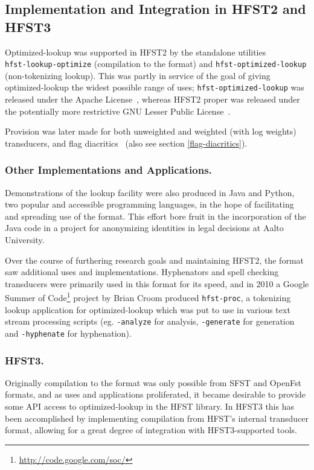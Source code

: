 \documentclass{llncs}
\begin{document}
\subsection{Implementation and Integration in HFST2 and HFST3}
Optimized-lookup was supported in HFST2 by the standalone utilities\\
\verb+hfst-lookup-optimize+ (compilation to the format) and
\verb+hfst-optimized-lookup+ (non-tokenizing lookup). This was partly
in service of the goal of giving optimized-lookup the widest possible range
of uses; \verb+hfst-optimized-lookup+ was released under the
Apache License~\cite{apache-license}, whereas HFST2 proper was released
under the potentially more restrictive GNU Lesser Public
License~\cite{lgpl-license}.

Provision was later made for both unweighted and weighted (with log weights)
transducers, and flag diacritics~\cite{beesley/2003} (also see section
\ref{flag-diacritics}).

\subsubsection{Other Implementations and Applications.}
Demonstrations of the lookup facility were also
produced in Java and Python, two popular and accessible programming languages,
in the hope of facilitating and spreading use of the format. This effort
bore fruit in the incorporation of the Java code in a project for anonymizing
identities in legal decisions at Aalto University.

Over the course of furthering research goals and maintaining HFST2,
the format saw additional uses and implementations. Hyphenators and spell
checking transducers were primarily used in this format for its speed, and
in 2010 a Google Summer of Code\footnote{\url{http://code.google.com/soc/}} project by Brian Croom produced
\verb+hfst-proc+, a tokenizing lookup application for optimized-lookup which
was put to use in various text stream processing scripts (eg.
\verb+-analyze+ for analysis, \verb+-generate+ for generation and
\verb+-hyphenate+ for hyphenation).

\subsubsection{HFST3.}
Originally compilation to the format was only possible from SFST and OpenFst
formats, and as uses and applications proliferated, it became desirable to
provide some API access to optimized-lookup in the HFST library. In HFST3
this has been accomplished by implementing compilation from HFST's internal
transducer format, allowing for a great degree of integration with
HFST3-supported tools.
\end{document}
